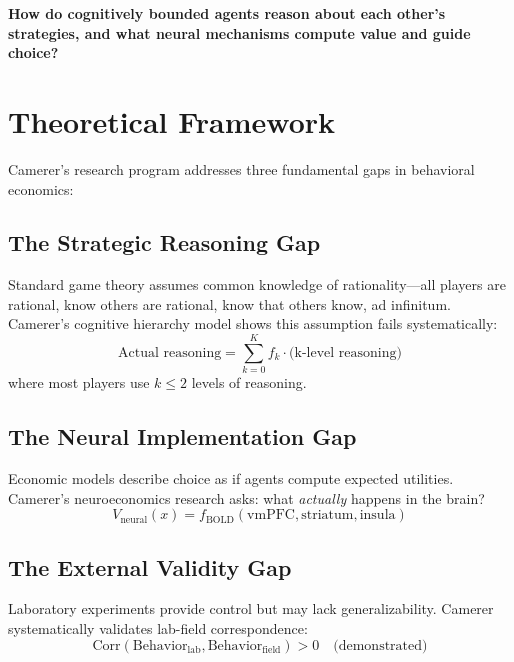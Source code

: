 \begin{tcolorbox}[colback=red!5!white, colframe=red!75!black,
    title=The Fundamental Question]
\textbf{How do cognitively bounded agents reason about each other's strategies, and what neural mechanisms compute value and guide choice?}
\end{tcolorbox}


\section{Theoretical Framework}
\label{sec:ca-theory}

Camerer's research program addresses three fundamental gaps in behavioral economics:

\subsection{The Strategic Reasoning Gap}

Standard game theory assumes common knowledge of rationality---all players are rational, know others are rational, know that others know, ad infinitum. Camerer's cognitive hierarchy model shows this assumption fails systematically:
\begin{equation}
\text{Actual reasoning} = \sum_{k=0}^{K} f_k \cdot \text{(k-level reasoning)}
\end{equation}
where most players use $k \leq 2$ levels of reasoning.

\subsection{The Neural Implementation Gap}

Economic models describe choice as if agents compute expected utilities. Camerer's neuroeconomics research asks: what \textit{actually} happens in the brain?
\begin{equation}
V_{\text{neural}}(x) = f_{\text{BOLD}}(\text{vmPFC}, \text{striatum}, \text{insula})
\end{equation}

\subsection{The External Validity Gap}

Laboratory experiments provide control but may lack generalizability. Camerer systematically validates lab-field correspondence:
\begin{equation}
\text{Corr}(\text{Behavior}_{\text{lab}}, \text{Behavior}_{\text{field}}) > 0 \quad \text{(demonstrated)}
\end{equation}


